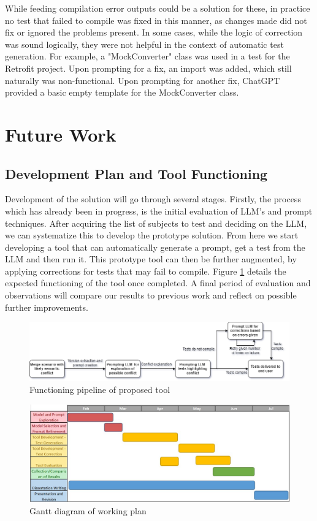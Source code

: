 While feeding compilation error outputs could be a solution for these, in practice no test that failed to compile was fixed in this manner, as changes made did not fix or ignored the problems present. In some cases, while the logic of correction was sound logically, they were not helpful in the context of automatic test generation. For example, a "MockConverter" class was used in a test for the Retrofit project. Upon prompting for a fix, an import was added, which still naturally was non-functional. Upon prompting for another fix, ChatGPT provided a basic empty template for the MockConverter class.

\section{Future Work}

\subsection{Development Plan and Tool Functioning}

Development of the solution will go through several stages. Firstly, the process which has already been in progress, is the initial evaluation of LLM's and prompt techniques. After acquiring the list of subjects to test and deciding on the LLM, we can systematize this to develop the prototype solution. From here we start developing a tool that can automatically generate a prompt, get a test from the LLM and then run it. This prototype tool can then be further augmented, by applying corrections for tests that may fail to compile. Figure \ref{fig:tool} details the expected functioning of the tool once completed. A final period of evaluation and observations will compare our results to previous work and reflect on possible further improvements.

\begin{figure}
    \centering
    \includegraphics[width=1\linewidth]{figures/tool.png}
    \caption{Functioning pipeline of proposed tool}
    \label{fig:tool}
\end{figure}

\begin{figure}
    \centering
    \includegraphics[width=1\linewidth]{figures/gantt.jpg}
    \caption{Gantt diagram of working plan}
    \label{fig:gantt}
\end{figure}
